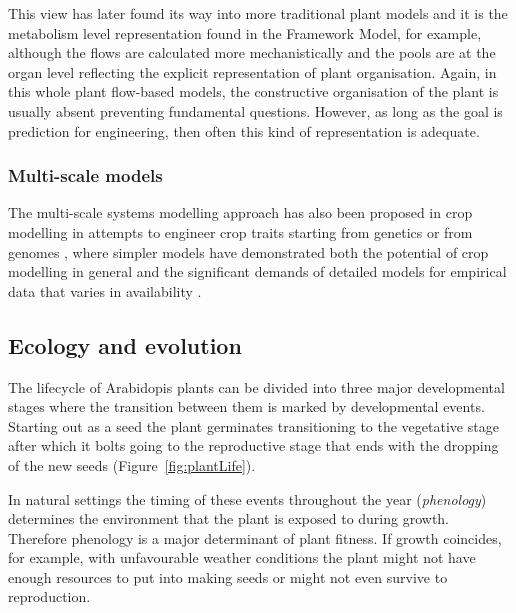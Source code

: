 This view has later found its way into more traditional plant models and it is
the metabolism level representation found in the Framework Model, for example,
although the flows are calculated more mechanistically and the pools are at the
organ level reflecting the explicit representation of plant organisation. Again,
in this whole plant flow-based models, the constructive organisation of the
plant is usually absent preventing fundamental questions. However, as long as
the goal is prediction for engineering, then often this kind of representation
is adequate.


\subsubsection*{Multi-scale models}
The multi-scale systems modelling approach has also been proposed in crop
modelling in attempts to engineer crop traits starting from genetics or from
genomes \citep{welch_merging_2005, yin_applying_nodate, yin_modelling_2010,
  parent_can_2014, wu_connecting_2016, chenu_integrating_2018}, where simpler
models have demonstrated both the potential of crop modelling in general and the
significant demands of detailed models for empirical data that varies in
availability \citep{hammer_models_2006,asseng_uncertainty_2013}.


\subsection{Ecology and evolution}
%
The lifecycle of Arabidopis plants can be divided into three major
developmental stages where the transition between them is marked by
developmental events. Starting out as a seed the plant germinates transitioning
to the vegetative stage after which it bolts going to the reproductive stage
that ends with the dropping of the new seeds (Figure~\ref{fig:plantLife}).

In natural settings the timing of these events throughout the year
(\emph{phenology}) determines the environment that the plant is exposed to
during growth. Therefore phenology is a major determinant of plant fitness. If
growth coincides, for example, with unfavourable weather conditions the plant
might not have enough resources to put into making seeds or might not even
survive to reproduction.

